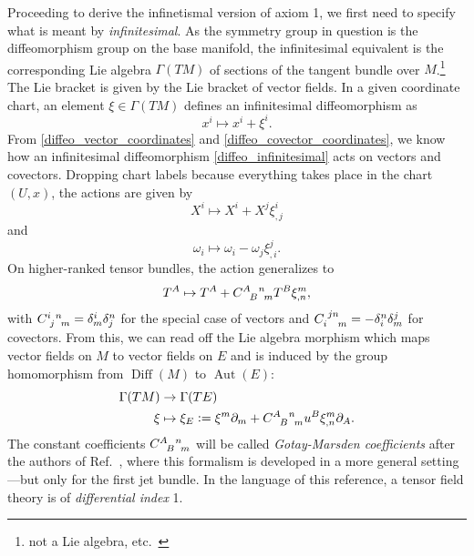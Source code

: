 Proceeding to derive the infinetismal version of axiom 1, we first need to specify what is meant by \emph{infinitesimal}. As the symmetry group in question is the diffeomorphism group on the base manifold, the infinitesimal equivalent is the corresponding Lie algebra $\Gamma(TM)$ of sections of the tangent bundle over $M$.\footnote{not a Lie algebra, etc.~\cite{}} The Lie bracket is given by the Lie bracket of vector fields. In a given coordinate chart, an element $\xi\in\Gamma(TM)$ defines an infinitesimal diffeomorphism as
\begin{equation}\label{diffeo_infinitesimal}
  x^i \mapsto x^i + \xi^i.
\end{equation}
From \eqref{diffeo_vector_coordinates} and \eqref{diffeo_covector_coordinates}, we know how an infinitesimal diffeomorphism \eqref{diffeo_infinitesimal} acts on vectors and covectors. Dropping chart labels because everything takes place in the chart $(U,x)$, the actions are given by
\begin{equation}
  X^i \mapsto X^i + X^j \xi^i_{,j}
\end{equation}
and
\begin{equation}
  \omega_i \mapsto \omega_i - \omega_j \xi^j_{,i}.
\end{equation}
On higher-ranked tensor bundles, the action generalizes to
\begin{equation}
  T^A \mapsto T^A + C^{A\hphantom Bn}_{\hphantom AB\hphantom nm}T^B \xi^m_{,n},
\end{equation}
with $C^{i\hphantom jn}_{\hphantom ij\hphantom nm} = \delta^i_m \delta^n_j$ for the special case of vectors and $C_{i\hphantom{jn}m}^{\hphantom ijn}=-\delta^n_i\delta^j_m$ for covectors. From this, we can read off the Lie algebra morphism which maps vector fields on $M$ to vector fields on $E$ and is induced by the group homomorphism from $\operatorname{Diff}(M)$ to $\operatorname{Aut}(E)$:
\begin{equation}\label{algebra_morphism}
  \begin{aligned}
    \Gamma(TM) &{} \rightarrow \Gamma(TE) \\
    \xi &{} \mapsto \xi_E \vcentcolon= \xi^m\partial_m + C^{A\hphantom Bn}_{\hphantom AB\hphantom nm}u^B \xi^m_{,n} \partial_A.
  \end{aligned}
\end{equation}
The constant coefficients $C^{A\hphantom Bn}_{\hphantom AB\hphantom nm}$ will be called \emph{Gotay-Marsden coefficients} after the authors of Ref.~\cite{Gotay_1992}, where this formalism is developed in a more general setting---but only for the first jet bundle. In the language of this reference, a tensor field theory is of \emph{differential index} 1.

